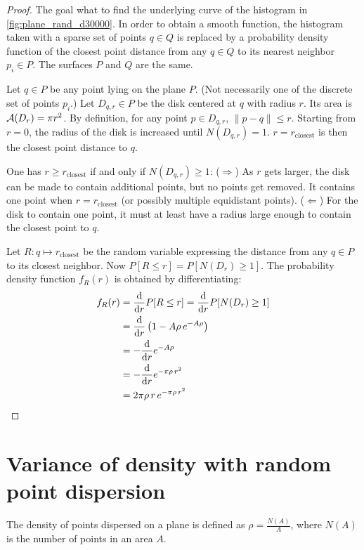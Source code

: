 \begin{proof}
The goal what to find the underlying curve of the histogram in \ref{fig:plane_rand_d30000}. In order to obtain a smooth function, the histogram taken with a sparse set of points $q \in Q$ is replaced by a probability density function of the closest point distance from any $q \in Q$ to its nearest neighbor $p_i \in P$. The surfaces $P$ and $Q$ are the same.

Let $q \in P$ be any point lying on the plane $P$. (Not necessarily one of the discrete set of points $p_i$.) Let $D_{q,r} \in P$ be the disk centered at $q$ with radius $r$. Its area is $\mathcal{A}(D_{r}) = \pi r^2$. By definition, for any point $p \in D_{q,r}$, $\| p - q \| \leq r$. Starting from $r = 0$, the radius of the disk is increased until $N(D_{q,r}) = 1$. $r = r_{\text{closest}}$ is then the closest point distance to $q$.

One has $r \geq r_{\text{closest}}$ if and only if $N(D_{q,r}) \geq 1$: ($\Rightarrow$) As $r$ gets larger, the disk can be made to contain additional points, but no points get removed. It contains one point when $r = r_{\text{closest}}$ (or possibly multiple equidistant points). ($\Leftarrow$) For the disk to contain one point, it must at least have a radius large enough to contain the closest point to $q$.

Let $R : q \mapsto r_{\text{closest}}$ be the random variable expressing the distance from any $q \in P$ to its closest neighbor. Now $P[R \leq r] = P[N(D_{r}) \geq 1]$. The probability density function $f_R(r)$ is obtained by differentiating:
\begin{equation}
\begin{align}
f_R(r)
& = \frac{\mathrm{d}}{\mathrm{d} r} P[R \leq r] = \frac{\mathrm{d}}{\mathrm{d} r} P[N(D_{r}) \geq 1]\\
& = \frac{\mathrm{d}}{\mathrm{d} r} \left( 1 - A \rho \, e^{-A \rho} \right)\\
& = - \frac{\mathrm{d}}{\mathrm{d} r} e^{-A \rho}\\
& = - \frac{\mathrm{d}}{\mathrm{d} r} e^{-\pi \rho \, r^2}\\
& = 2 \pi \rho \, r \, e^{-\pi \rho \, r^2}
\end{align}
\end{equation}
\end{proof}




\section{Variance of density with random point dispersion}  \label{sec:proof_var_rand_pt_disp}
The density of points dispersed on a plane is defined as $\rho = \frac{N(A)}{A}$, where $N(A)$ is the number of points in an area $A$.

